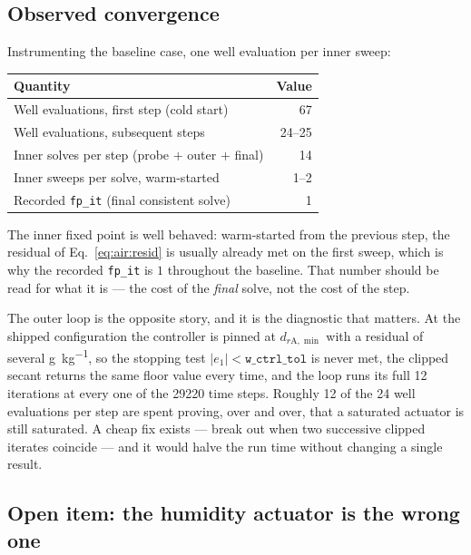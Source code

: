 \documentclass[11pt]{article}
\begin{document}
\subsection{Observed convergence}
\label{sec:air:converge}

Instrumenting the baseline case, one well evaluation per inner sweep:

\begin{center}
\begin{tabular}{@{}lr@{}}
\toprule
Quantity & Value \\
\midrule
Well evaluations, first step (cold start)      & \num{67} \\
Well evaluations, subsequent steps             & \num{24}--\num{25} \\
Inner solves per step (probe $+$ outer $+$ final) & \num{14} \\
Inner sweeps per solve, warm-started           & \num{1}--\num{2} \\
Recorded \texttt{fp\_it} (final consistent solve) & \num{1} \\
\bottomrule
\end{tabular}
\end{center}

The inner fixed point is well behaved: warm-started from the previous step, the
residual of Eq.~\eqref{eq:air:resid} is usually already met on the first sweep,
which is why the recorded \texttt{fp\_it} is $1$ throughout the baseline. That
number should be read for what it is --- the cost of the \emph{final} solve,
not the cost of the step.

The outer loop is the opposite story, and it is the diagnostic that matters. At
the shipped configuration the controller is pinned at $d_{r\mathrm{A},\min}$
with a residual of several \si{\gram\per\kilogram}, so the stopping test
$|e_1|<\texttt{w\_ctrl\_tol}$ is never met, the clipped secant returns the same
floor value every time, and the loop runs its full \num{12} iterations at every
one of the \num{29220} time steps. Roughly \num{12} of the \num{24} well
evaluations per step are spent proving, over and over, that a saturated
actuator is still saturated. A cheap fix exists --- break out when two
successive clipped iterates coincide --- and it would halve the run time
without changing a single result.

\subsection{Open item: the humidity actuator is the wrong one}
\label{sec:air:openitem}
\end{document}
